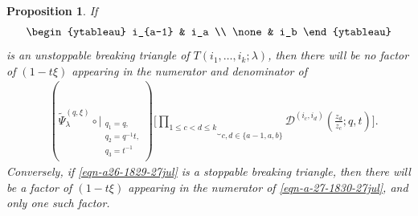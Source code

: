 \documentclass[12pt,reqno,a4paper]{amsart}
\newcommand{\comp}{\circ}
\newcommand{\cals}[1]{\mathcal{#1}}
\numberwithin{equation}{section}
\newtheorem{prop}[thm]{Proposition}
\newcommand{\dualmap}{
\widetilde{\Psi}^{(q,\xi)}_{\lambda}
}
\theoremstyle{definition}
\begin{document}
\begin{prop}
\label{prp-a11-1816-27jul}
If 
\begin{align}
	\begin{ytableau}
		i_{a-1} & i_a
		\\
		\none & i_b
	\end{ytableau}
	\label{eqn-a26-1829-27jul}
\end{align}
is an unstoppable breaking triangle of $T(i_1,\dots,i_k;\lambda)$, then there will be no factor of $(1-t\xi)$ appearing in the numerator and denominator of 
\begin{align}
	&(
	\dualmap
	\comp 
	\bigg|_{
		\substack{
			q_1 = q, \\
			q_2 = q^{-1}t,\\
			q_3 = t^{-1} \\
		}
	}
	)
	\Bigg[
	\underbrace{		\prod_{1 \leq c < d \leq k}			}_{c,d \in \{a-1,a,b\}}
	\cals{D}^{(i_c,i_d)}\left(
	\frac{z_d}{z_c}
	; q, t
	\right)
	\Bigg].
	\label{eqn-a-27-1830-27jul}
\end{align}
Conversely, if \eqref{eqn-a26-1829-27jul} is a stoppable breaking triangle, then there will be a factor of $(1-t\xi)$ appearing in the numerator of \eqref{eqn-a-27-1830-27jul}, and only one such factor. 
\end{prop}
\end{document}
